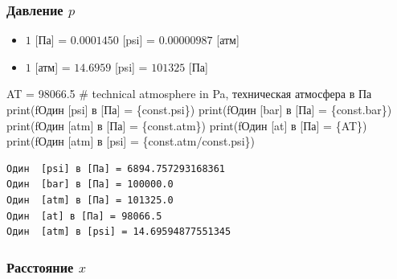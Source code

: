 \documentclass[
  russian,
  letterpaper,
  DIV=11,
  numbers=noendperiod,
  oneside]{scrartcl}
\newenvironment{Shaded}{\begin{snugshade}}{\end{snugshade}}
\newcommand{\BuiltInTok}[1]{\textcolor[rgb]{0.00,0.23,0.31}{#1}}
\newcommand{\CommentTok}[1]{\textcolor[rgb]{0.37,0.37,0.37}{#1}}
\newcommand{\FloatTok}[1]{\textcolor[rgb]{0.68,0.00,0.00}{#1}}
\newcommand{\NormalTok}[1]{\textcolor[rgb]{0.00,0.23,0.31}{#1}}
\newcommand{\OperatorTok}[1]{\textcolor[rgb]{0.37,0.37,0.37}{#1}}
\newcommand{\SpecialCharTok}[1]{\textcolor[rgb]{0.37,0.37,0.37}{#1}}
\newcommand{\SpecialStringTok}[1]{\textcolor[rgb]{0.13,0.47,0.30}{#1}}
\providecommand{\tightlist}{%
  \setlength{\itemsep}{0pt}\setlength{\parskip}{0pt}}
\begin{document}
\subsubsection{\texorpdfstring{Давление
\(p\)}{Давление p}}\label{ux434ux430ux432ux43bux435ux43dux438ux435-p}

\begin{itemize}
\tightlist
\item
  \(1\) {[}Па{]} = \(0.0001450\) {[}psi{]} = \(0.00000987\) {[}атм{]}
\item
  \(1\) {[}атм{]} = \(14.6959\) {[}psi{]} = \(101325\) {[}Па{]}
\end{itemize}

\begin{Shaded}
\begin{Highlighting}[]
\NormalTok{AT }\OperatorTok{=} \FloatTok{98066.5}  \CommentTok{\# technical atmosphere in Pa,  техническая атмосфера в Па}
\BuiltInTok{print}\NormalTok{(}\SpecialStringTok{f\textquotesingle{}Один  [psi] в [Па] = }\SpecialCharTok{\{}\NormalTok{const}\SpecialCharTok{.}\NormalTok{psi}\SpecialCharTok{\}}\SpecialStringTok{\textquotesingle{}}\NormalTok{)}
\BuiltInTok{print}\NormalTok{(}\SpecialStringTok{f\textquotesingle{}Один  [bar] в [Па] = }\SpecialCharTok{\{}\NormalTok{const}\SpecialCharTok{.}\NormalTok{bar}\SpecialCharTok{\}}\SpecialStringTok{\textquotesingle{}}\NormalTok{)}
\BuiltInTok{print}\NormalTok{(}\SpecialStringTok{f\textquotesingle{}Один  [atm] в [Па] = }\SpecialCharTok{\{}\NormalTok{const}\SpecialCharTok{.}\NormalTok{atm}\SpecialCharTok{\}}\SpecialStringTok{\textquotesingle{}}\NormalTok{)}
\BuiltInTok{print}\NormalTok{(}\SpecialStringTok{f\textquotesingle{}Один  [at] в [Па] = }\SpecialCharTok{\{}\NormalTok{AT}\SpecialCharTok{\}}\SpecialStringTok{\textquotesingle{}}\NormalTok{)}
\BuiltInTok{print}\NormalTok{(}\SpecialStringTok{f\textquotesingle{}Один  [atm] в [psi] = }\SpecialCharTok{\{}\NormalTok{const}\SpecialCharTok{.}\NormalTok{atm}\OperatorTok{/}\NormalTok{const}\SpecialCharTok{.}\NormalTok{psi}\SpecialCharTok{\}}\SpecialStringTok{\textquotesingle{}}\NormalTok{)}
\end{Highlighting}
\end{Shaded}

\begin{verbatim}
Один  [psi] в [Па] = 6894.757293168361
Один  [bar] в [Па] = 100000.0
Один  [atm] в [Па] = 101325.0
Один  [at] в [Па] = 98066.5
Один  [atm] в [psi] = 14.69594877551345
\end{verbatim}

\subsubsection{\texorpdfstring{Расстояние
\(x\)}{Расстояние x}}\label{ux440ux430ux441ux441ux442ux43eux44fux43dux438ux435-x}
\end{document}
